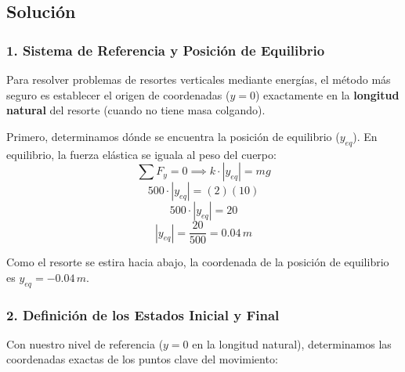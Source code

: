 \documentclass[12pt, a4paper]{article}
\begin{document}
\begin{center}
\end{center}

\subsection*{Solución}

\subsubsection*{1. Sistema de Referencia y Posición de Equilibrio}
Para resolver problemas de resortes verticales mediante energías, el método más seguro es establecer el origen de coordenadas ($y = 0$) exactamente en la \textbf{longitud natural} del resorte (cuando no tiene masa colgando).

Primero, determinamos dónde se encuentra la posición de equilibrio ($y_{eq}$). En equilibrio, la fuerza elástica se iguala al peso del cuerpo:
$$ \sum F_y = 0 \implies k \cdot |y_{eq}| = mg $$
$$ 500 \cdot |y_{eq}| = (2)(10) $$
$$ 500 \cdot |y_{eq}| = 20 $$
$$ |y_{eq}| = \frac{20}{500} = 0.04 \, \si{m} $$

Como el resorte se estira hacia abajo, la coordenada de la posición de equilibrio es $y_{eq} = -0.04 \, \si{m}$.

\subsubsection*{2. Definición de los Estados Inicial y Final}
Con nuestro nivel de referencia ($y=0$ en la longitud natural), determinamos las coordenadas exactas de los puntos clave del movimiento:
\end{document}
